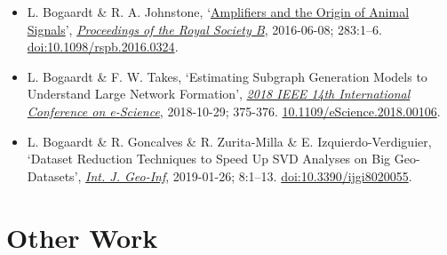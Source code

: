 \documentclass[a4paper,9pt]{extarticle}
\begin{document}
\begin{itemize}[leftmargin=*]
\setlength{\itemsep}{-0.7mm}
\item L. Bogaardt \& R. A. Johnstone, `\href{http://www.bogaardt.eu/?s=m2p}{Amplifiers and the Origin of Animal Signals}', \textit{\href{http://rspb.royalsocietypublishing.org/content/283/1832/20160324}{Proceedings of the Royal Society B}}, 2016-06-08; 283:1--6. \href{http://doi.org/10.1098/rspb.2016.0324}{doi:10.1098/rspb.2016.0324}.
\item L. Bogaardt \& F. W. Takes, `Estimating Subgraph Generation Models to Understand Large Network Formation', \textit{\href{https://ieeexplore.ieee.org/abstract/document/8588725}{2018 IEEE 14th International Conference on e-Science}}, 2018-10-29; 375-376. \href{http://doi.org/10.1109/eScience.2018.00106}{10.1109/eScience.2018.00106}.
\item L. Bogaardt \& R. Goncalves \& R. Zurita-Milla \& E. Izquierdo-Verdiguier, `Dataset Reduction Techniques to Speed Up SVD Analyses on Big Geo-Datasets', \textit{\href{https://www.mdpi.com/2220-9964/8/2/55}{Int. J. Geo-Inf}}, 2019-01-26; 8:1--13. \href{http://doi.org/10.3390/ijgi8020055}{doi:10.3390/ijgi8020055}.
\end{itemize}

\vspace{0mm}

\section*{Other Work}
\end{document}
